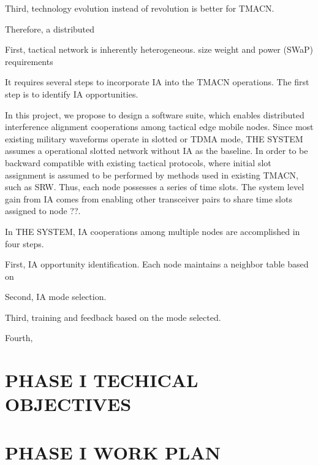 \documentclass[letterpaper,11pt,onecolumn]{article}
\begin{document}
Third,  technology evolution instead of revolution is better for TMACN.

Therefore, a distributed 

First, tactical network is inherently heterogeneous.  size weight and power (SWaP) requirements 





It requires several steps to incorporate IA into the TMACN operations. The first step is to identify IA opportunities. 

In this project, we propose to design a software suite, which enables distributed interference alignment cooperations among tactical edge mobile nodes.  Since most existing military waveforms operate in slotted or TDMA mode, THE SYSTEM assumes a operational slotted network without IA as the baseline. In order to be backward compatible with existing tactical protocols,  where initial slot assignment is assumed to be performed by methods used in existing TMACN, such as SRW. Thus, each node possesses a series of time slots. The system level gain from IA comes from enabling other transceiver pairs to share time slots assigned to node ??. 

In THE SYSTEM, IA cooperations among multiple nodes are accomplished in four steps. 

First, IA opportunity identification. Each node maintains a neighbor table based on 

Second, IA mode selection.

Third, training and feedback based on the mode selected.

Fourth, 


\section{PHASE I TECHICAL OBJECTIVES}

\section{PHASE I WORK PLAN}
\end{document}
